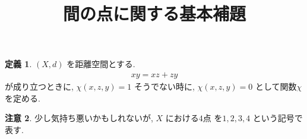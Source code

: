 \documentclass[10pt, fleqn, label-section=none]{bxjsarticle}
\title{間の点に関する基本補題}
\date{}
\author{}
\theoremstyle{definition}
\newtheorem{dfn}{定義}[section]
\newtheorem{remark}[dfn]{注意}
\renewcommand{\;}{\, ; \,}
\begin{document}
\maketitle

\section{}


\begin{dfn}$(X, d)$ を距離空間とする. 
\begin{align*} xy = xz + zy \end{align*}
が成り立つときに, $\chi(x, z, y) = 1$ そうでない時に, $\chi(x, z, y) = 0$ として関数$\chi $ を定める. 
\end{dfn}

\begin{remark}少し気持ち悪いかもしれないが, $X$ における$4$点 を$1, 2, 3, 4$ という記号で表す. 

\end{remark}
\end{document}
